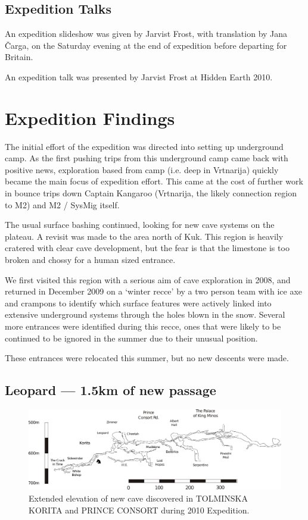 \documentclass[english,a4]{article}
\begin{document}
\subsection{Expedition Talks}

An expedition slideshow was given by Jarvist Frost, with translation by Jana
\v{C}arga, on the Saturday evening at the end of expedition before departing
for Britain.

An expedition talk was presented by Jarvist Frost at Hidden Earth 2010.

\section{Expedition Findings}

The initial effort of the expedition was directed into setting up underground
camp. As the first pushing trips from this underground camp came back with
positive news, exploration based from camp (i.e. deep in Vrtnarija) quickly
became the main focus of expedition effort. This came at the cost of further
work in bounce trips down Captain Kangaroo (Vrtnarija, the likely connection
region to M2) and M2 / SysMig itself. 

The usual surface bashing continued, looking for new cave systems on the
plateau. A revisit was made to the area north of Kuk. This region is heavily
cratered with clear cave development, but the fear is that the limestone is too
broken and chossy for a human sized entrance. 

We first visited this region with a serious aim of cave exploration in 2008,
and returned in December 2009 on a `winter recce' by a two person team with ice
axe and crampons to identify which surface features were actively linked into
extensive underground systems through the holes blown in the snow. Several more
entrances were identified during this recce, ones that were likely to be
continued to be ignored in the summer due to their unusual position.

These entrances were relocated this summer, but no new descents were made.

\subsection{Leopard --- 1.5km of new passage}

\begin{figure}[!h]
\centering
\includegraphics[width=0.9\columnwidth]{2010_new_stuff_extended_extraction}
\caption{Extended elevation of new cave discovered in \textsc{TOLMINSKA KORITA} and \textsc{PRINCE
CONSORT} during 2010 Expedition.}
\end{figure}
\end{document}
